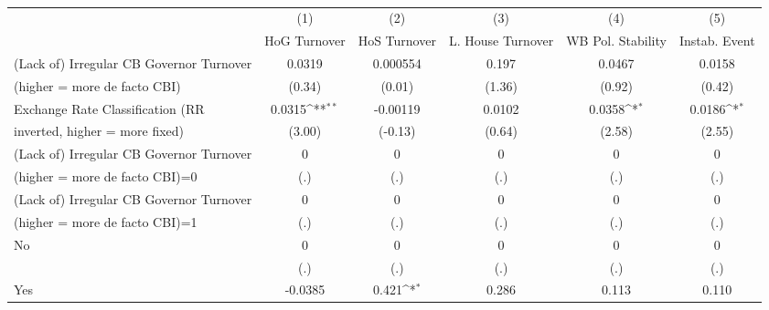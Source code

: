 \begin{table}[htbp]\centering
\def\sym#1{\ifmmode^{#1}\else\(^{#1}\)\fi}
\caption{\label{ifullicmultIndFEDF}}
\begin{tabular}{l*{5}{c}}
\toprule
                                        &\multicolumn{1}{c}{(1)}&\multicolumn{1}{c}{(2)}&\multicolumn{1}{c}{(3)}&\multicolumn{1}{c}{(4)}&\multicolumn{1}{c}{(5)}\\
                                        &\multicolumn{1}{c}{HoG Turnover}&\multicolumn{1}{c}{HoS Turnover}&\multicolumn{1}{c}{L. House Turnover}&\multicolumn{1}{c}{WB Pol. Stability}&\multicolumn{1}{c}{Instab. Event}\\
\midrule
(Lack of) Irregular CB Governor Turnover&   0.0319         & 0.000554         &    0.197         &   0.0467         &   0.0158         \\
(higher = more de facto CBI)            &   (0.34)         &   (0.01)         &   (1.36)         &   (0.92)         &   (0.42)         \\
\addlinespace
Exchange Rate Classification (RR        &   0.0315\sym{**} & -0.00119         &   0.0102         &   0.0358\sym{*}  &   0.0186\sym{*}  \\
inverted, higher = more fixed)          &   (3.00)         &  (-0.13)         &   (0.64)         &   (2.58)         &   (2.55)         \\
\addlinespace
(Lack of) Irregular CB Governor Turnover&        0         &        0         &        0         &        0         &        0         \\
(higher = more de facto CBI)=0          &      (.)         &      (.)         &      (.)         &      (.)         &      (.)         \\
\addlinespace
(Lack of) Irregular CB Governor Turnover&        0         &        0         &        0         &        0         &        0         \\
(higher = more de facto CBI)=1          &      (.)         &      (.)         &      (.)         &      (.)         &      (.)         \\
\addlinespace
No                                      &        0         &        0         &        0         &        0         &        0         \\
                                        &      (.)         &      (.)         &      (.)         &      (.)         &      (.)         \\
\addlinespace
Yes                                     &  -0.0385         &    0.421\sym{*}  &    0.286         &    0.113         &    0.110         \\

\end{tabular}
\end{table}

